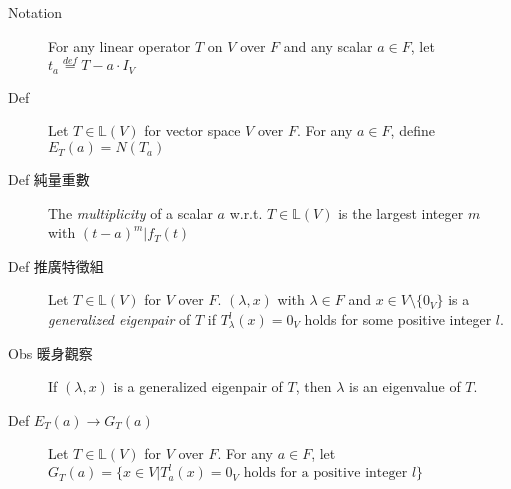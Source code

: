 \documentclass[9pt, twocolumn]{extarticle}
\newcommand{\ltrans}{\mathbb{L}}
\begin{document}
\begin{description}
        
    \item[Notation] For any linear operator $T$ on $V$ over $F$ and any scalar $a \in F$, let $t_a \overset{def}{=} T  - a \cdot I_V$
    \item[Def] Let $T \in \ltrans(V)$ for vector space $V$ over $F$. For any $a \in F$, define $E_T(a) = N(T_a)$
    \item[Def  純量重數] The \emph{multiplicity} of a scalar $a$ w.r.t. $T \in \ltrans(V)$ is the largest integer $m$ with $(t -a)^m | f_T(t)$
    \item[Def 推廣特徵組] Let $T \in \ltrans(V)$ for $V$ over $F$. $(\lambda, x)$ with $\lambda \in F$ and $x \in V \setminus \{0_V\}$ is a \emph{generalized eigenpair} of $T$ if $T_\lambda^l (x) = 0_V$ holds for some positive integer $l$.
    \item[Obs 暖身觀察] If $(\lambda, x)$ is a generalized eigenpair of $T$, then $\lambda$ is an eigenvalue of $T$.
    \item[Def $E_T(a)\rightarrow G_T(a)$] Let $T \in \ltrans (V)$ for $V$ over $F$. For any $a \in F$, let $G_T (a) = \{x \in V | T_a^l (x) = 0_V \text{ holds for a positive integer }l\}$ 


\end{description}
\end{document}
